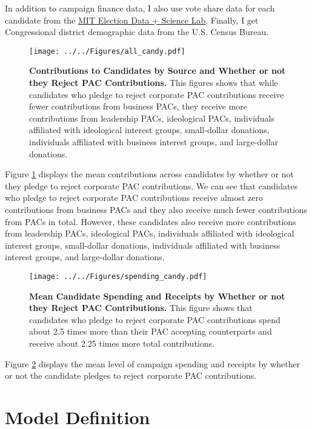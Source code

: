 \documentclass[12pt]{article}
\begin{document}
In addition to campaign finance data, I also use vote share data for each candidate from the \href{https://electionlab.mit.edu/data}{MIT Election Data + Science Lab}. Finally, I get Congressional district demographic data from the U.S. Census Bureau.  

\begin{figure}[ht]
	\centering
	\texttt{[image: ../../Figures/all\_candy.pdf]}
	\caption{\textbf{Contributions to Candidates by Source and Whether or not they Reject PAC Contributions.} This figures shows that while candidates who pledge to reject corporate PAC contributions receive fewer contributions from business PACs, they receive more contributions from leadership PACs, ideological PACs, individuals affiliated with ideological interest groups, small-dollar donations, individuals affiliated with business interest groups, and large-dollar donations.}
	\label{fig: all contribs}
\end{figure}

Figure \ref{fig: all contribs} displays the mean contributions across candidates by whether or not they pledge to reject corporate PAC contributions. We can see that candidates who pledge to reject corporate PAC contributions receive almost zero contributions from business PACs and they also receive much fewer contributions from PACs in total. However, these candidates also receive more contributions from leadership PACs, ideological PACs, individuals affiliated with ideological interest groups, small-dollar donations, individuals affiliated with business interest groups, and large-dollar donations.

\begin{figure}[ht]
	\centering
	\texttt{[image: ../../Figures/spending\_candy.pdf]}
	\caption{\textbf{Mean Candidate Spending and Receipts by Whether or not they Reject PAC Contributions.} This figure shows that candidates who pledge to reject corporate PAC contributions spend about 2.5 times more than their PAC accepting counterparts and receive about 2.25 times more total contributions.}
	\label{fig: spending}
\end{figure}

Figure \ref{fig: spending} displays the mean level of campaign spending and receipts by whether or not the candidate pledges to reject corporate PAC contributions.


\section{Model Definition}
\end{document}
